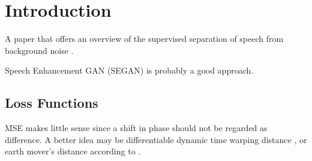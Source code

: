 \section{Introduction}

A paper that offers an overview of the supervised separation of speech from background noise \parencite{2017-speech-seperation-overview}.



Speech Enhancement GAN (SEGAN) \parencite{2017-SEGAN} is probably a good approach.


\subsection{Loss Functions}

MSE makes little sense since a shift in phase should not be regarded as difference. A better idea may be 
differentiable dynamic time warping distance \parencite{2017-wasserstein-gan}, or earth mover's distance 
\parencite{2017-loss-function-for-time-series} according to \textcite{2019-deep-learning-audio-processing}.



